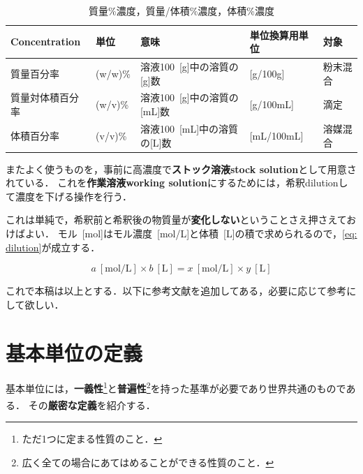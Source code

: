 \documentclass[a4paper,11pt]{ltjsarticle}
\numberwithin{equation}{section}
\renewcommand{\cite}[1]{\textsuperscript{\citep{#1}}}
\begin{document}
\begin{table}[htbp]
  \caption{質量\%濃度，質量/体積\%濃度，体積\%濃度}
  \label{tab: con-1}
  \centering
  \begin{tabular}{lllll}
    \hline
    Concentration & 単位 & 意味 & 単位換算用単位 & 対象 \\
    \hline
    質量百分率 & (w/w)\% & 溶液100\ [g]中の溶質の[g]数 & [g/100g] & 粉末混合 \\
    質量対体積百分率 & (w/v)\% & 溶液100\ [g]中の溶質の[mL]数 & [g/100mL] & 滴定 \\
    体積百分率 & (v/v)\% & 溶液100\ [mL]中の溶質の[L]数 & [mL/100mL] & 溶媒混合 \\
    \hline
  \end{tabular}
\end{table}

またよく使うものを，事前に高濃度で\textbf{ストック溶液stock solution}として用意されている．
これを\textbf{作業溶液working solution}にするためには，希釈dilutionして濃度を下げる操作を行う．

これは単純で，希釈前と希釈後の物質量が\textbf{変化しない}ということさえ押さえておけばよい．
モル\ [mol]はモル濃度\ [mol/L]と体積\ [L]の積で求められるので，\cref{eq: dilution}が成立する．

\begin{equation}
  a\ [\mathrm{mol/L}] \times b\ [\mathrm{L}] = x\ [\mathrm{mol/L}] \times y\ [\mathrm{L}] \label{eq: dilution}
\end{equation}

これで本稿は以上とする．以下に参考文献を追加してある，必要に応じて参考にして欲しい．

\cleardoublepage

\lhead{}
{}



\cleardoublepage
\appendix
\begingroup
\renewcommand{\addcontentsline}[3]{}

%
%
%

\section{基本単位の定義}
\label{col: basic def}

基本単位には，\textbf{一義性}\footnote{ただ1つに定まる性質のこと．}と\textbf{普遍性}\footnote{広く全ての場合にあてはめることができる性質のこと．}を持った基準が必要であり世界共通のものである．
その\textbf{厳密な定義}\cite{units-1}を紹介する．
\end{document}
